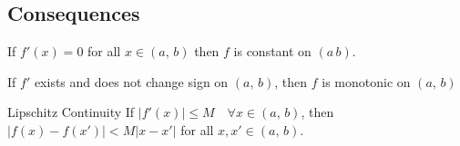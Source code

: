 \documentclass{article}
\begin{document}
\subsection{Consequences}
\noindent\begin{theorem}{}{}
 If $f'(x) = 0$ for all $x\in (a,\,b)$ then $f$ is constant on $(a\,b)$.
\end{theorem}\vspace{10pt}
\noindent\begin{theorem}{}{}
 If $f'$ exists and does not change sign on $(a,\,b)$, then $f$ is monotonic on $(a,\,b)$
\end{theorem}\vspace{10pt}
\noindent\begin{theorem}{Lipschitz Continuity}{}
 If $|f'(x)|\le M \quad\forall x\in(a,\,b)$, then $|f(x) - f(x')| < M|x - x'|$ for all $x, x' \in (a,\,b)$.
\end{theorem}\vspace{10pt}
\end{document}
